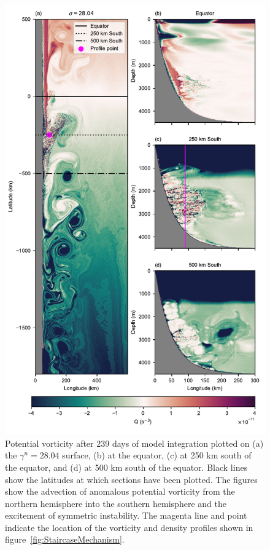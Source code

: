\begin{figure}[hp]
    \centering
    \includegraphics{../figures/Figure4.pdf}
    \caption{Potential vorticity after 239 days of model integration plotted on (a) the $\gamma^n = 28.04$ surface, (b) at the equator, (c) at 250 km south of the equator, and (d) at 500 km south of the equator. Black lines show the latitudes at which sections have been plotted. The figures show the advection of anomalous potential vorticity from the northern hemisphere into the southern hemisphere and the excitement of symmetric instability. The magenta line and point indicate the location of the vorticity and density profiles shown in figure~\ref{fig:StaircaseMechanism}.}
    \label{fig:PV}
\end{figure}

